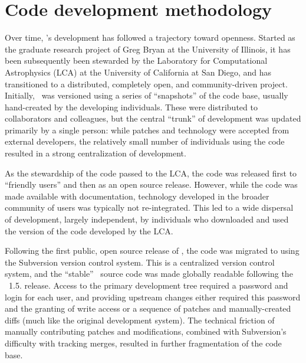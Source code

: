 
\section{Code development methodology}
\label{sec.development}

Over time, \enzo's development has followed a trajectory toward
openness.  Started as the graduate research project of Greg Bryan at
the University of Illinois, it has been subsequently been stewarded by
the Laboratory for Computational Astrophysics (LCA) at the University
of California at San Diego, and has transitioned to a distributed,
completely open, and community-driven project.  Initially, \enzo\ was
versioned using a series of ``snapshots'' of the code base, usually
hand-created by the developing individuals.  These were distributed to
collaborators and colleagues, but the central ``trunk'' of development
was updated primarily by a single person: while patches and technology
were accepted from external developers, the relatively small number of
individuals using the code resulted in a strong centralization of
development.

As the stewardship of the code passed to the LCA, the code was
released first to ``friendly users'' and then as an open source
release.  However, while the code was made available with
documentation, technology developed in the broader community of users
was typically not re-integrated.  This led to a wide dispersal of
development, largely independent, by individuals who downloaded and
used the version of the code developed by the LCA.

Following the first public, open source release of \enzo, the code was
migrated to using the Subversion version control system.  This is a
centralized version control system, and the ``stable'' \enzo\ source
code was made globally readable following the \enzo\ 1.5. release.
Access to the primary development tree required a password and login
for each user, and providing upstream changes either required this
password and the granting of write access or a sequence of patches and
manually-created diffs (much like the original development system).
The technical friction of manually contributing patches and
modifications, combined with Subversion's difficulty with tracking
merges, resulted in further fragmentation of the code base.

